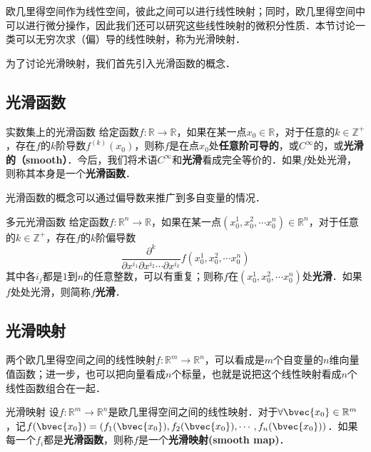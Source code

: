 
欧几里得空间作为线性空间，彼此之间可以进行线性映射；同时，欧几里得空间中可以进行微分操作，因此我们还可以研究这些线性映射的微积分性质．本节讨论一类可以无穷次求（偏）导的线性映射，称为光滑映射．

为了讨论光滑映射，我们首先引入光滑函数的概念．

\subsection{光滑函数}

\begin{definition}{实数集上的光滑函数}
给定函数$f:\mathbb{R}\rightarrow\mathbb{R}$，如果在某一点$x_0\in\mathbb{R}$，对于任意的$k\in\mathbb{Z}^+$，存在$f$的$k$阶导数$f^{(k)}(x_0)$，则称$f$是在点$x_0$处\textbf{任意阶可导的}，或$C^\infty$的，或\textbf{光滑的（smooth）}．今后，我们将术语$C^{\infty}$和\textbf{光滑}看成完全等价的．如果$f$处处光滑，则称其本身是一个\textbf{光滑函数}．
\end{definition}

光滑函数的概念可以通过偏导数来推广到多自变量的情况．

\begin{definition}{多元光滑函数}
给定函数$f:\mathbb{R}^n\rightarrow\mathbb{R}$，如果在某一点$(x_0^1, x_0^2, \cdots x_0^n) \in\mathbb{R}^n$，对于任意的$k\in\mathbb{Z}^+$，存在$f$的$k$阶偏导数$$\frac{\partial^k}{\partial x^{i_1}\partial x^{i_2}\cdots\partial x^{i_k}}f(x_0^1, x_0^2, \cdots x_0^n)$$其中各$i_j$都是$1$到$n$的任意整数，可以有重复；则称$f$在$(x_0^1, x_0^2, \cdots x_0^n)$处\textbf{光滑}．如果$f$处处光滑，则简称$f$\textbf{光滑}．
\end{definition}

\subsection{光滑映射}

两个欧几里得空间之间的线性映射$f:\mathbb{R}^m\rightarrow \mathbb{R}^n$，可以看成是$m$个自变量的$n$维向量值函数；进一步，也可以把向量看成$n$个标量，也就是说把这个线性映射看成$n$个线性函数组合在一起．

\begin{definition}{光滑映射}
设$f:\mathbb{R}^m\rightarrow \mathbb{R}^n$是欧几里得空间之间的线性映射．对于$\forall \bvec{x_0} \in \mathbb{R}^m$，记$f(\bvec{x_0})=(f_1(\bvec{x_0}), f_2(\bvec{x_0}),\cdots, f_n(\bvec{x_0}))$．如果每一个$f_i$都是\textbf{光滑函数}，则称$f$是一个\textbf{光滑映射(smooth map)}．
\end{definition}



